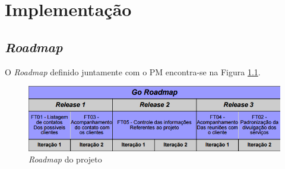 \chapter{Implementação}

\section{\textit{Roadmap}}

O \textit{Roadmap} definido juntamente com o PM encontra-se na Figura \ref{roadmap}.

\begin{figure}[!htb]
\centering
\includegraphics[scale=0.6]{figuras/roadmap.png}
\caption{\textit{Roadmap} do projeto}
\label{roadmap}
\end{figure}